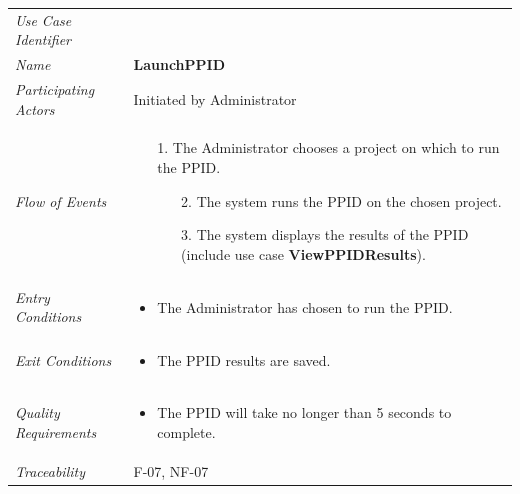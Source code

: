 \documentclass[12pt,letterpaper]{article}
\begin{document}
\begin{center}
	\begin{tabu} to 
		\toprule
		Use Case Identifier & \launchppid{} \\
		Name & {\bf LaunchPPID} \\
		Participating Actors & Initiated by Administrator \\
		Flow of Events & 
	    \begin{enumerate}[topsep=-1em,leftmargin=*]
		    \item[1.] The Administrator chooses a project on which to run the PPID.
		    \begin{enumerate}
		        \item[2.] The system runs the PPID on the chosen project.
		        \item[3.] The system displays the results of the PPID (include use case \textbf{ViewPPIDResults}).
		    \end{enumerate}
		\end{enumerate} \\

		Entry Conditions &
		\begin{itemize}[topsep=-1em,leftmargin=*]
		    \item The Administrator has chosen to run the PPID.
        \end{itemize} \\

		Exit Conditions &
		\begin{itemize}[topsep=-1em,leftmargin=*]
		    \item The PPID results are saved.
        \end{itemize} \\

		Quality Requirements &
		\begin{itemize}[topsep=-1em,leftmargin=*]
		    \item The PPID will take no longer than 5 seconds to complete.
        \end{itemize} \\

		Traceability & F-07, NF-07 \\
		\toprule
	\end{tabu}
\end{center}
\end{document}
